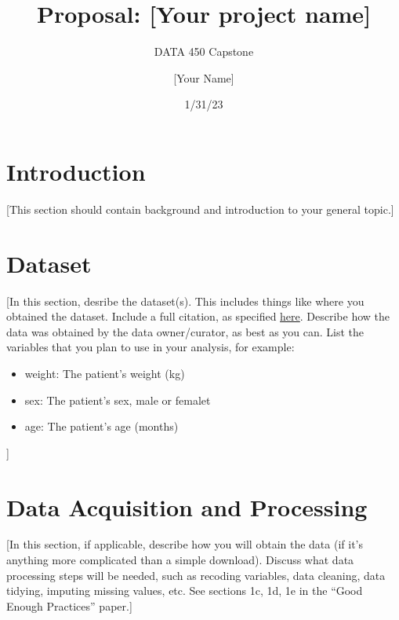 \documentclass[
  letterpaper,
  DIV=11,
  numbers=noendperiod]{scrartcl}
\title{Proposal: {[}Your project name{]}}
\subtitle{DATA 450 Capstone}
\author{{[}Your Name{]}}
\date{1/31/23}
\providecommand{\tightlist}{%
  \setlength{\itemsep}{0pt}\setlength{\parskip}{0pt}}\usepackage{longtable,booktabs,array}
\begin{document}
\maketitle
\ifdefined\Shaded\renewenvironment{Shaded}{\begin{tcolorbox}[borderline west={3pt}{0pt}{shadecolor}, sharp corners, frame hidden, boxrule=0pt, interior hidden, breakable, enhanced]}{\end{tcolorbox}}\fi

\hypertarget{introduction}{%
\section{Introduction}\label{introduction}}

{[}This section should contain background and introduction to your
general topic.{]}

\hypertarget{dataset}{%
\section{Dataset}\label{dataset}}

{[}In this section, desribe the dataset(s). This includes things like
where you obtained the dataset. Include a full citation, as specified
\href{https://guides.lib.umich.edu/c.php?g=282964\&p=3285995}{here}.
Describe how the data was obtained by the data owner/curator, as best as
you can. List the variables that you plan to use in your analysis, for
example:

\begin{itemize}
\tightlist
\item
  weight: The patient's weight (kg)
\item
  sex: The patient's sex, male or femalet
\item
  age: The patient's age (months)
\end{itemize}

{]}

\hypertarget{data-acquisition-and-processing}{%
\section{Data Acquisition and
Processing}\label{data-acquisition-and-processing}}

{[}In this section, if applicable, describe how you will obtain the data
(if it's anything more complicated than a simple download). Discuss what
data processing steps will be needed, such as recoding variables, data
cleaning, data tidying, imputing missing values, etc. See sections 1c,
1d, 1e in the ``Good Enough Practices'' paper.{]}
\end{document}
